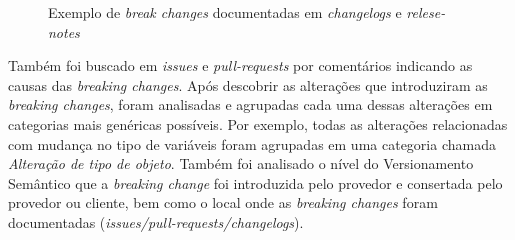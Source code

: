 \begin {figure} [h!]
{        
    }
    \caption{Exemplo de \textit{break changes} documentadas em \textit{changelogs} e \textit{relese-notes}}
    \label{fig:result_rq1_once_twice_three}
\end{figure}

Também foi buscado em \textit{issues} e \textit{pull-requests} por comentários indicando as causas das \textit{breaking changes}. Após descobrir as alterações que introduziram as \textit{breaking changes}, foram analisadas e agrupadas cada uma dessas alterações em categorias mais genéricas possíveis. Por exemplo, todas as alterações relacionadas com mudança no tipo de variáveis foram agrupadas em uma categoria chamada \textit{Alteração de tipo de objeto}. Também foi analisado o nível do Versionamento Semântico que a \textit{breaking change} foi introduzida pelo provedor e consertada pelo provedor ou cliente, bem como o local onde as \textit{breaking changes} foram documentadas (\textit{issues/pull-requests/changelogs}).

